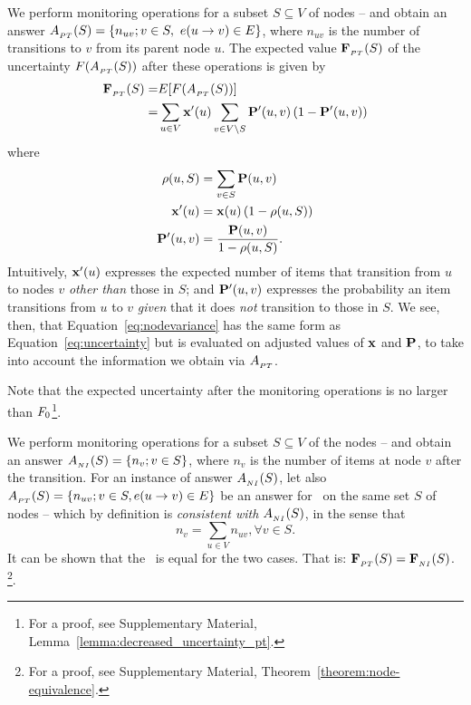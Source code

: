 We 
perform monitoring operations for
a subset $S\subseteq V$ of nodes --
and obtain an answer 
$A_{_{\sc PT}}(S) = \{n_{uv}; v\in S,\ e(u\rightarrow v)\in E\}$,
where $n_{uv}$ is the number of transitions to $v$ from its parent node $u$. 
The expected value $\mathbf{F}_{_{\sc PT}}(S)$ of the uncertainty 
$F(A_{_{\sc PT}}(S))$ 
after these operations is given by
\begin{align}
\label{eq:nodevariance}
\mathbf{F}_{_{\sc PT}}(S) = & E[F(A_{_{\sc PT}}(S))] \nonumber \\ 
= & \sum_{u\in V}\mathbf{x}^{\prime}(u)\sum_{v\in V\setminus S}\mathbf{P}^{\prime}(u,v)\left(1-\mathbf{P}^{\prime}(u,v)\right) 
\end{align}
where 
\begin{align}
\rho(u,S) & = \sum_{v\in S}\mathbf{P}(u,v) \nonumber \\
 \mathbf{x}^{\prime}(u) & = \mathbf{x}(u)\left(1-\rho(u,S)\right) \label{eq:adjustedx}\\
 \mathbf{P}^{\prime}(u,v) & = \frac{\mathbf{P}(u,v)}{1-\rho(u,S)}. \label{eq:adjustedP}
\end{align}
Intuitively, $\mathbf{x}^{\prime}(u)$ expresses the expected number
of items that transition from $u$ to nodes $v$ {\it other than} those in $S$;
and $\mathbf{P}^{\prime}(u,v)$ expresses the probability an item transitions
from $u$ to $v$ {\it given} that it does {\it not} transition to those in $S$.
We see, then, that Equation~\eqref{eq:nodevariance} has the same form as 
Equation~\eqref{eq:uncertainty} but is evaluated on adjusted values of
$\mathbf{x}$ and $\mathbf{P}$, to take into account the
information we obtain via $A_{_{\sc PT}}$.

Note that the expected uncertainty after
the monitoring operations is no larger than $F_0$\footnote{For a proof, see Supplementary Material, Lemma~\ref{lemma:decreased_uncertainty_pt}.}.


We 
perform monitoring operations for
a subset $S\subseteq V$ of the nodes --
and obtain an answer 
$A_{_{\sc NI}}(S) 
= \{n_v; v\in S\}$, where $n_v$ is the number of items at node $v$
after the transition.
For an instance of answer $A_{_{\sc NI}}(S)$,
let also $A_{_{\sc PT}}(S) = \{n_{uv}; v\in S, 
  e(u\rightarrow v)\in E\}$ 
be an answer for \parentstransitions\ on the same set $S$ of nodes
-- which by definition
is {\it consistent with} $A_{_{\sc NI}}(S)$, in the sense that
\begin{equation}
n_v = \sum_{u\in V} n_{uv}, \forall v\in S.
\end{equation}
It can be shown that the \expecteduncertainty\ is equal for the two cases.
That is: 
$\mathbf{F}_{_{\sc PT}}(S) = \mathbf{F}_{_{\sc NI}}(S)$.
\footnote{For a proof, see Supplementary Material, 
Theorem~\ref{theorem:node-equivalence}.}.

